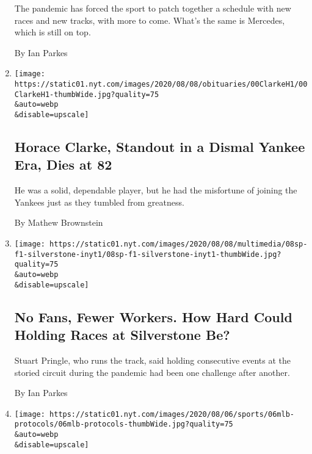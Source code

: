 \begin{enumerate}
  The pandemic has forced the sport to patch together a schedule with
  new races and new tracks, with more to come. What's the same is
  Mercedes, which is still on top.

  By Ian Parkes
\item
  \href{/2020/08/07/sports/baseball/horace-clarke-dead.html}{}

  \texttt{[image: https://static01.nyt.com/images/2020/08/08/obituaries/00ClarkeH1/00ClarkeH1-thumbWide.jpg?quality=75\\\&auto=webp\\\&disable=upscale]}

  \hypertarget{horace-clarke-standout-in-a-dismal-yankee-era-dies-at-82}{%
  \subsection{Horace Clarke, Standout in a Dismal Yankee Era, Dies at
  82}\label{horace-clarke-standout-in-a-dismal-yankee-era-dies-at-82}}

  He was a solid, dependable player, but he had the misfortune of
  joining the Yankees just as they tumbled from greatness.

  By Mathew Brownstein
\item
  \href{/2020/08/07/sports/autoracing/formula-1-silverstone-pandemic.html}{}

  \texttt{[image: https://static01.nyt.com/images/2020/08/08/multimedia/08sp-f1-silverstone-inyt1/08sp-f1-silverstone-inyt1-thumbWide.jpg?quality=75\\\&auto=webp\\\&disable=upscale]}

  \hypertarget{no-fans-fewer-workers-how-hard-could-holding-races-at-silverstone-be}{%
  \subsection{No Fans, Fewer Workers. How Hard Could Holding Races at
  Silverstone
  Be?}\label{no-fans-fewer-workers-how-hard-could-holding-races-at-silverstone-be}}

  Stuart Pringle, who runs the track, said holding consecutive events at
  the storied circuit during the pandemic had been one challenge after
  another.

  By Ian Parkes
\item
  \href{/2020/08/06/sports/baseball/mlb-safety-protocols.html}{}

  \texttt{[image: https://static01.nyt.com/images/2020/08/06/sports/06mlb-protocols/06mlb-protocols-thumbWide.jpg?quality=75\\\&auto=webp\\\&disable=upscale]}

  \hypertarget{mlb-tightens-virus-protocols-again-in-wake-of-outbreaks}{%
}
\end{enumerate}
